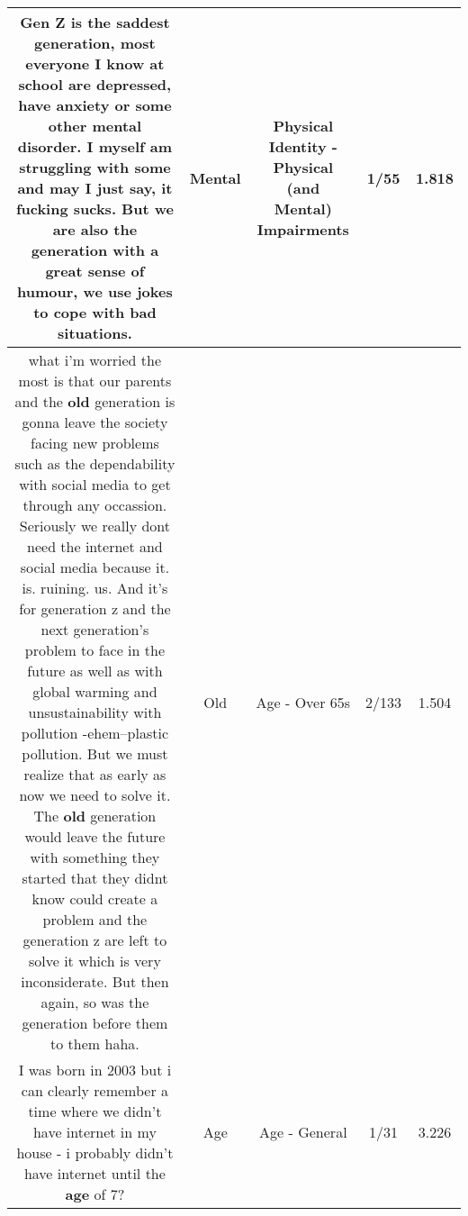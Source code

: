 \documentclass[11pt]{article}
\newlength\mylength
\begin{document}
\begin{center}
\begin{longtable}{|C{.65\mylength}|C{.30\mylength}|C{.12\mylength}|C{.12\mylength}|C{.12\mylength}|}
  \small Gen Z is the saddest generation, most everyone I know at school are depressed, have anxiety or some other \textbf{mental} disorder. I myself am struggling with some and may I just say, it fucking sucks. But we are also the generation with a great sense of humour, we use jokes to cope with bad situations.\normalsize   & Mental & Physical Identity - Physical (and Mental) Impairments & 1/55 & 1.818 \\  \hline
  \small what i'm worried the most is that our parents and the \textbf{old} generation is gonna leave the society facing new problems such as the dependability with social media to get through any occassion. Seriously we really dont need the internet and social media because it. is. ruining. us. And it's for generation z and the next generation's problem to face in the future as well as with global warming and unsustainability with pollution -ehem--plastic pollution.  But we must realize that as early as now we need to solve it. The \textbf{old} generation would leave the future with something they started that they didnt know could create a problem and the generation z are left to solve it which is very inconsiderate. But then again, so was the generation before them to them haha.\normalsize   & Old & Age - Over 65s & 2/133 & 1.504 \\  \hline
  \small I was born in 2003 but i can clearly remember a time where we didn't have internet in my house - i probably didn't have internet until the \textbf{age} of 7?\normalsize   & Age & Age - General & 1/31 & 3.226 \\  \hline

\end{longtable}
\end{center}
\end{document}
